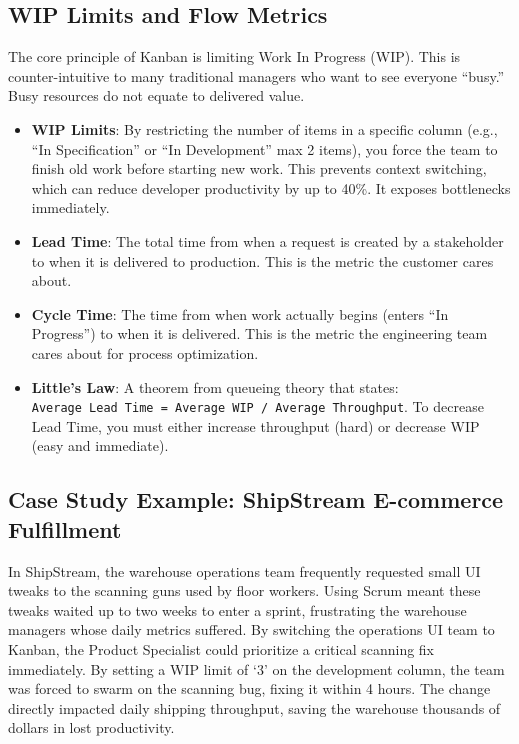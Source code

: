 \documentclass[
  11pt,
  openany,
  oneside]{book}
\providecommand{\tightlist}{%
  \setlength{\itemsep}{0pt}\setlength{\parskip}{0pt}}
\begin{document}
\subsection{WIP Limits and Flow
Metrics}\label{wip-limits-and-flow-metrics}

The core principle of Kanban is limiting Work In Progress (WIP). This is
counter-intuitive to many traditional managers who want to see everyone
``busy.'' Busy resources do not equate to delivered value.

\begin{itemize}
\tightlist
\item
  \textbf{WIP Limits}: By restricting the number of items in a specific
  column (e.g., ``In Specification'' or ``In Development'' max 2 items),
  you force the team to finish old work before starting new work. This
  prevents context switching, which can reduce developer productivity by
  up to 40\%. It exposes bottlenecks immediately.
\item
  \textbf{Lead Time}: The total time from when a request is created by a
  stakeholder to when it is delivered to production. This is the metric
  the customer cares about.
\item
  \textbf{Cycle Time}: The time from when work actually begins (enters
  ``In Progress'') to when it is delivered. This is the metric the
  engineering team cares about for process optimization.
\item
  \textbf{Little's Law}: A theorem from queueing theory that states:
  \texttt{Average\ Lead\ Time\ =\ Average\ WIP\ /\ Average\ Throughput}.
  To decrease Lead Time, you must either increase throughput (hard) or
  decrease WIP (easy and immediate).
\end{itemize}

\subsection{Case Study Example: ShipStream E-commerce
Fulfillment}\label{case-study-example-shipstream-e-commerce-fulfillment}

In ShipStream, the warehouse operations team frequently requested small
UI tweaks to the scanning guns used by floor workers. Using Scrum meant
these tweaks waited up to two weeks to enter a sprint, frustrating the
warehouse managers whose daily metrics suffered. By switching the
operations UI team to Kanban, the Product Specialist could prioritize a
critical scanning fix immediately. By setting a WIP limit of `3' on the
development column, the team was forced to swarm on the scanning bug,
fixing it within 4 hours. The change directly impacted daily shipping
throughput, saving the warehouse thousands of dollars in lost
productivity.
\end{document}
